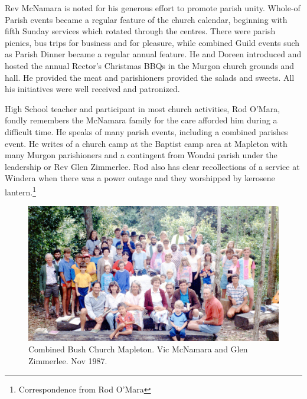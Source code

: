 Rev McNamara is noted for his generous effort to promote parish unity. Whole-of Parish events became a regular feature of the church calendar, beginning with fifth Sunday services which rotated through the centres. There were parish picnics, bus trips for business and for pleasure, while combined Guild events such as Parish Dinner became a regular annual feature. He and Doreen introduced and hosted the annual Rector's Christmas BBQs in the Murgon church grounds and hall. He provided the meat and parishioners provided the salads and sweets. All his initiatives were well received and patronized.



High School teacher and participant in most church activities, Rod O'Mara, fondly remembers the McNamara family for the care afforded him during a difficult time. He speaks of many parish events, including a combined parishes event. He writes of a church camp at the Baptist camp area at Mapleton with many Murgon parishioners and a contingent from Wondai parish under the leadership or Rev Glen Zimmerlee. Rod also has clear recollections of a service at Windera when there was a power outage and they worshipped by kerosene lantern.\footnote{Correspondence from Rod O'Mara}








\begin{figure}[!htb]
\begin{center}
\includegraphics[width=1.\textwidth,center]{../images/bushChuchMapleton1987.jpg}
\caption{Combined Bush Church Mapleton. Vic McNamara and Glen Zimmerlee. Nov 1987.}
\end{center}
\end{figure}




